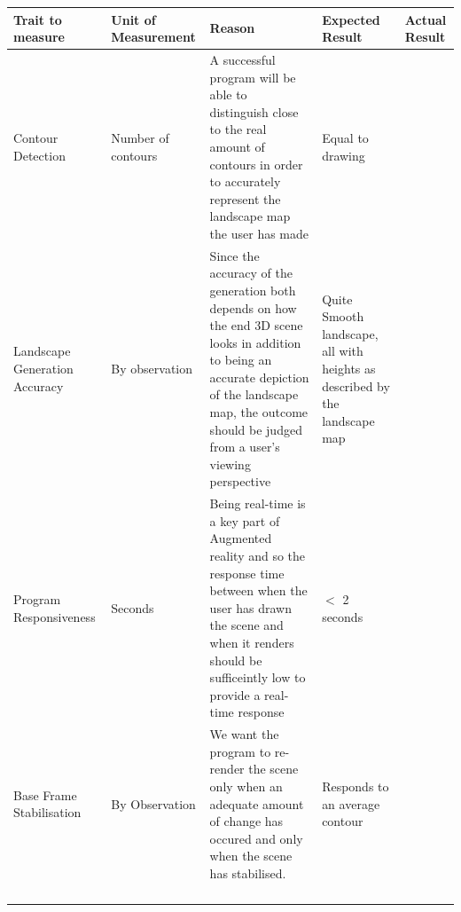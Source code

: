 \documentclass[11pt]{article}
\begin{document}
\newpage
\begin{landscape}
\begin{longtable}{p{}|p{}|p{}|p{}|p{}}
\hline \hline
Trait to measure & Unit of Measurement & Reason & Expected Result & Actual Result \\
\hline \hline
Contour Detection &  Number of contours & A successful program will be able to 
										distinguish close to the real amount of 
										contours in order to accurately represent the	
										landscape map the user 
													has made      & Equal to drawing&  			  \\
\hline
Landscape Generation
	Accuracy     & By observation	   & Since the accuracy of the generation both
										 depends on how the end 3D scene looks in 
										 addition to being an accurate depiction of
										 the landscape map, the outcome should be 
										 judged from a user's viewing perspective
										        & Quite Smooth landscape,
										          all with heights as described by
										          the landscape map &  			  \\
\hline
Program Responsiveness &  Seconds      & Being real-time is a key part of Augmented
									  	 reality and so the response time between 
									  	 when the user has drawn the scene and when it
									  	 renders should be sufficeintly low to 
									  	 provide a real-time response
									  	        &    $<$ 2 seconds       &  			  \\
\hline
Base Frame 
   Stabilisation & By Observation	   & We want the program to re-render the scene
   										 only when an adequate amount of change has 
   										 occured and only when the scene has 
   										 stabilised. & Responds to an average contour    &  			  \\
              
                 &                     &        &                 &  			  \\
                 &                     &        &                 &  			  \\
                 &                     &        &                 &  			  \\                                                                                                     
                 &                     &        &                 & 
\label{fig:TestMeasureTable}
\end{longtable}
\end{landscape}
\newpage
\end{document}

